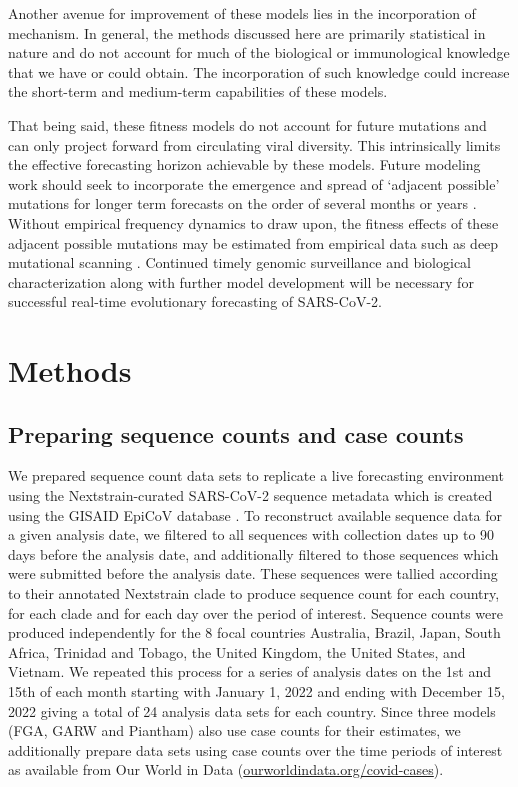\documentclass[11pt,oneside,letterpaper]{article}
\begin{document}
Another avenue for improvement of these models lies in the incorporation of mechanism.
In general, the methods discussed here are primarily statistical in nature and do not account for much of the biological or immunological knowledge that we have or could obtain.
The incorporation of such knowledge could increase the short-term and medium-term capabilities of these models.

That being said, these fitness models do not account for future mutations and can only project forward from circulating viral diversity.
This intrinsically limits the effective forecasting horizon achievable by these models.
Future modeling work should seek to incorporate the emergence and spread of `adjacent possible' mutations for longer term forecasts on the order of several months or years \cite{kauffman1993origins}.
Without empirical frequency dynamics to draw upon, the fitness effects of these adjacent possible mutations may be estimated from empirical data such as deep mutational scanning \cite{cao2022ba, greaney2022antibody, dadonaite2023full}.
Continued timely genomic surveillance and biological characterization along with further model development will be necessary for successful real-time evolutionary forecasting of SARS-CoV-2.

\section*{Methods}

\subsection*{Preparing sequence counts and case counts}

We prepared sequence count data sets to replicate a live forecasting environment using the Nextstrain-curated SARS-CoV-2 sequence metadata \cite{hadfield2018nextstrain} which is created using the GISAID EpiCoV database \cite{khare2021gisaid}.
To reconstruct available sequence data for a given analysis date, we filtered to all sequences with collection dates up to 90 days before the analysis date, and additionally filtered to those sequences which were submitted before the analysis date.
These sequences were tallied according to their annotated Nextstrain clade to produce sequence count for each country, for each clade and for each day over the period of interest.
Sequence counts were produced independently for the 8 focal countries Australia, Brazil, Japan, South Africa, Trinidad and Tobago, the United Kingdom, the United States, and Vietnam.
We repeated this process for a series of analysis dates on the 1st and 15th of each month starting with January 1, 2022 and ending with December 15, 2022 giving a total of 24 analysis data sets for each country.
Since three models (FGA, GARW and Piantham) also use case counts for their estimates, we additionally prepare data sets using case counts over the time periods of interest as available from Our World in Data (\href{https://ourworldindata.org/covid-cases}{ourworldindata.org/covid-cases}).
\end{document}
